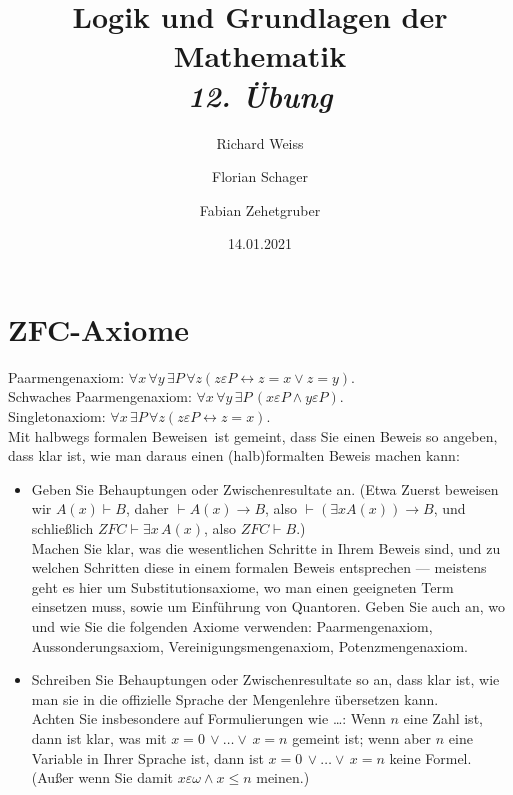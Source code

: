 \documentclass{article}
\title
{
  Logik und Grundlagen der Mathematik \\
  \vspace{4pt}
  \normalsize
  \textit{12. Übung}
}
\author
{
  Richard Weiss
  \and
  Florian Schager
  \and
  Fabian Zehetgruber
}
\date{14.01.2021}
\begin{document}
\maketitle

\section*{ZFC-Axiome}

Paarmengenaxiom: $\forall x\, \forall y\, \exists P \, \forall z
(z \varepsilon P \leftrightarrow z = x \lor z = y)$. \\
Schwaches Paarmengenaxiom: $\forall x\, \forall y\, \exists P\, (x \varepsilon P \land y \varepsilon P)$. \\
Singletonaxiom: $\forall x \, \exists P \, \forall z (z \varepsilon P \leftrightarrow z = x)$. \\
Mit \glqq halbwegs formalen Beweisen\grqq\ ist gemeint, dass Sie einen Beweis so
angeben, dass klar ist, wie man daraus einen (halb)formalten Beweis machen kann:
\begin{itemize}
  \item Geben Sie Behauptungen oder Zwischenresultate an. (Etwa \glqq Zuerst beweisen
  wir $A(x) \vdash B$, daher $\vdash A(x) \rightarrow B$, also $\vdash (\exists x A(x)) \rightarrow B$,
  und schließlich $ZFC \vdash \exists x \, A(x)$, also $ZFC \vdash B$.\grqq) \\
  Machen Sie klar, was die wesentlichen Schritte in Ihrem Beweis sind, und zu
  welchen Schritten diese in einem formalen Beweis entsprechen --- meistens
  geht es hier um Substitutionsaxiome, wo man einen geeigneten Term einsetzen muss,
  sowie um Einführung von Quantoren. Geben Sie auch an, wo und wie Sie die folgenden
  Axiome verwenden: Paarmengenaxiom, Aussonderungsaxiom, Vereinigungsmengenaxiom,
  Potenzmengenaxiom.
  \item Schreiben Sie Behauptungen oder Zwischenresultate so an, dass klar ist,
  wie man sie in die offizielle Sprache der Mengenlehre übersetzen kann. \\
  Achten Sie insbesondere auf Formulierungen wie \glqq\dots\grqq: Wenn $n$ eine
  Zahl ist, dann ist klar, was mit $x = 0\, \lor \dots \lor\, x = n$ gemeint ist;
  wenn aber $n$ eine Variable in Ihrer Sprache ist, dann ist $x = 0\, \lor \dots \lor\, x = n$
  keine Formel. (Außer wenn Sie damit $x \varepsilon \omega \land x \leq n$ meinen.)
\end{itemize}





\end{document}
